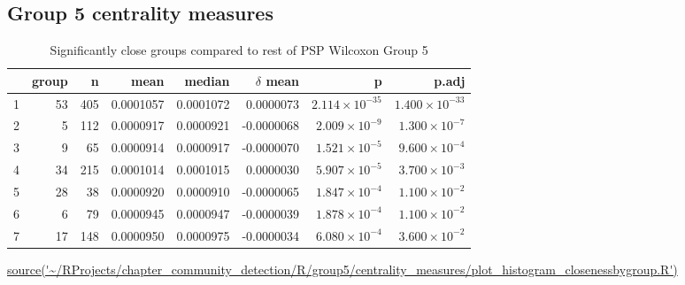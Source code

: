 \subsection{Group 5 centrality measures}
\begin{table}[ht]
\centering
\setlength{\extrarowheight}{2pt}
\begin{tabular}{rrrrrrrr}
  \toprule
 & group & n & mean & median & $\delta$ mean & p & p.adj \\ 
  \midrule
1 & 53 & 405 & 0.0001057 & 0.0001072 & 0.0000073 & $2.114 \times 10^{-35}$ & $1.400 \times 10^{-33}$ \\ 
  2 & 5 & 112 & 0.0000917 & 0.0000921 & -0.0000068 & $2.009 \times 10^{-9}$ & $1.300 \times 10^{-7}$ \\ 
  3 & 9 & 65 & 0.0000914 & 0.0000917 & -0.0000070 & $1.521 \times 10^{-5}$ & $9.600 \times 10^{-4}$ \\ 
  4 & 34 & 215 & 0.0001014 & 0.0001015 & 0.0000030 & $5.907 \times 10^{-5}$ & $3.700 \times 10^{-3}$ \\ 
  5 & 28 & 38 & 0.0000920 & 0.0000910 & -0.0000065 & $1.847 \times 10^{-4}$ & $1.100 \times 10^{-2}$ \\ 
  6 & 6 & 79 & 0.0000945 & 0.0000947 & -0.0000039 & $1.878 \times 10^{-4}$ & $1.100 \times 10^{-2}$ \\ 
  7 & 17 & 148 & 0.0000950 & 0.0000975 & -0.0000034 & $6.080 \times 10^{-4}$ & $3.600 \times 10^{-2}$ \\ 
   \bottomrule
\end{tabular}
\caption{Significantly close groups compared to rest of PSP Wilcoxon Group 5} 
\label{tab:closeness group 5}
\tiny\url{source('~/RProjects/chapter_community_detection/R/group5/centrality_measures/plot_histogram_closenessbygroup.R')}
\end{table}



